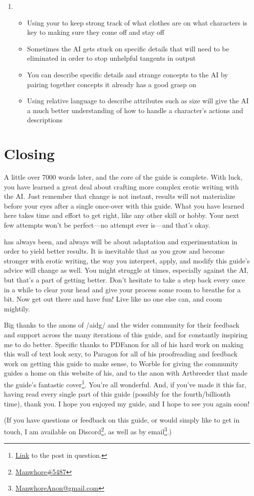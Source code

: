 ﻿\documentclass[Coomer-main.tex]{subfiles}
\begin{document}
\begin{enumerate}
\item {}

\begin{itemize}
\item Using your \rem to keep strong track of what clothes are on what characters is key to making sure they come off and stay off
\item Sometimes the AI gets stuck on specific details that will need to be eliminated in order to stop unhelpful tangents in output
\item You can describe specific details and strange concepts to the AI by pairing together concepts it already has a good grasp on
\item Using relative language to describe attributes such as size will give the AI a much better understanding of how to handle a character's actions and descriptions
\end{itemize}

\end{enumerate}

\chapter{Closing}

 A little over 7000 words later, and the core of the guide is complete.
With luck, you have learned a great deal about crafting more complex erotic writing with the AI.
Just remember that change is not instant, results will not materialize before your eyes after a single once-over with this guide.
What you have learned here takes time and effort to get right, like any other skill or hobby.
Your next few attempts won't be perfect—no attempt ever is—and that's okay.

\aid has always been, and always will be about adaptation and experimentation in order to yield better results.
It is inevitable that as you grow and become stronger with erotic writing, the way you interpret, apply, and modify this guide's advice will change as well.
You might struggle at times, especially against the AI, but that's a part of getting better.
Don't hesitate to take a step back every once in a while to clear your head and give your process some room to breathe for a bit.
Now get out there and have fun!
Live like no one else can, and coom mightily.

Big thanks to the anons of /aidg/ and the wider \aid community for their feedback and support across the many iterations of this guide, and for constantly inspiring me to do better.
Specific thanks to PDFanon for all of his hard work on making this wall of text look sexy, to Paragon for all of his proofreading and feedback work on getting this guide to make sense, to Worble for giving the community guides a home on this website of his, and to the anon with Artbreeder that made the guide’s fantastic cover\footnote{\href{https://arch.b4k.co/vg/thread/313360917/\#q313434592}{Link} to the post in question.}.
You're all wonderful.
And, if you've made it this far, having read every single part of this guide (possibly for the fourth/billionth time), thank you.
I hope you enjoyed my guide, and I hope to see you again soon!
\bigskip

(If you have questions or feedback on this guide, or would simply like to get in touch, I am available on Discord\footnote{\href{https://discordapp.com/users/773014944718389248}{Manwhore\#5487}}, as well as by email\footnote{\href{mailto:ManwhoreAnon@gmail.com}{ManwhoreAnon@gmail.com}}.)
\end{document}
